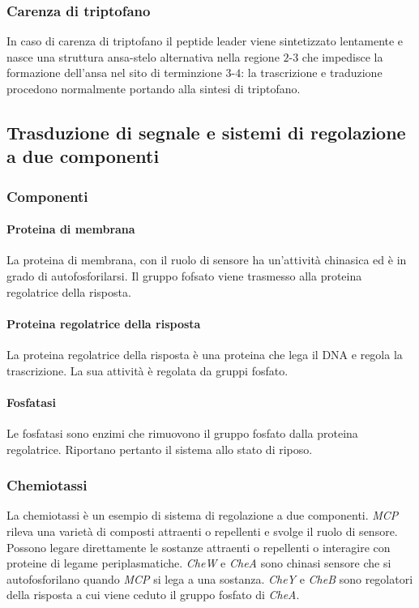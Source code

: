 		\subsubsection{Carenza di triptofano}
		In caso di carenza di triptofano il peptide leader viene sintetizzato lentamente e nasce una struttura ansa-stelo alternativa nella regione $2$-$3$ che impedisce la formazione dell'ansa nel sito di terminzione $3$-$4$: la trascrizione e traduzione procedono normalmente portando alla sintesi di triptofano.


	\subsection{Trasduzione di segnale e sistemi di regolazione a due componenti}

		\subsubsection{Componenti}

			\paragraph{Proteina di membrana}
			La proteina di membrana, con il ruolo di sensore ha un'attivit\`a chinasica ed \`e in grado di autofosforilarsi.
			Il gruppo fofsato viene trasmesso alla proteina regolatrice della risposta.

			\paragraph{Proteina regolatrice della risposta}
			La proteina regolatrice della risposta \`e una proteina che lega il DNA e regola la trascrizione.
			La sua attivit\`a \`e regolata da gruppi fosfato.

			\paragraph{Fosfatasi}
			Le fosfatasi sono enzimi che rimuovono il gruppo fosfato dalla proteina regolatrice.
			Riportano pertanto il sistema allo stato di riposo.

			
		\subsubsection{Chemiotassi}
		La chemiotassi \`e un esempio di sistema di regolazione a due componenti.
		\emph{MCP} rileva una variet\`a di composti attraenti o repellenti e svolge il ruolo di sensore.
		Possono legare direttamente le sostanze attraenti o repellenti o interagire con proteine di legame periplasmatiche.
		\emph{CheW} e \emph{CheA} sono chinasi sensore che si autofosforilano quando \emph{MCP} si lega a una sostanza.
		\emph{CheY} e \emph{CheB} sono regolatori della risposta a cui viene ceduto il gruppo fosfato di \emph{CheA}.

